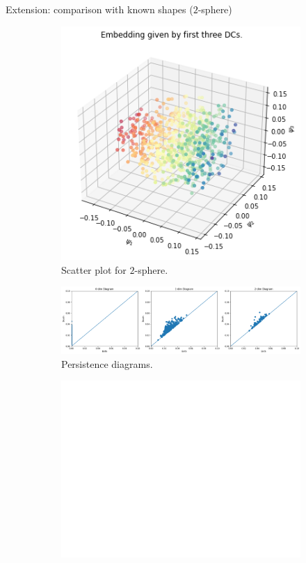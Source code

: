 \documentclass[xcolor={dvipsnames,svgnames}]{beamer}
\begin{document}
\begin{frame}{Extension: comparison with known shapes ($2$-sphere)}
    \begin{figure}[H]
\centering
\begin{subfigure}[b]{0.2\textwidth}
    \includegraphics[width=\textwidth]{figures/dsphere.png}
    \caption{Scatter plot for $2$-sphere.}
\end{subfigure}
\hfill
\begin{subfigure}[b]{0.75\textwidth}
    \includegraphics[width=\textwidth]{figures/dsphere_Hk.png}
    \caption{Persistence diagrams.}
\end{subfigure}
\begin{subfigure}[b]{0.25\textwidth}
\includegraphics[width=\textwidth]{figures/white.png} 

\end{subfigure}
\end{figure}
\end{frame}
\end{document}
